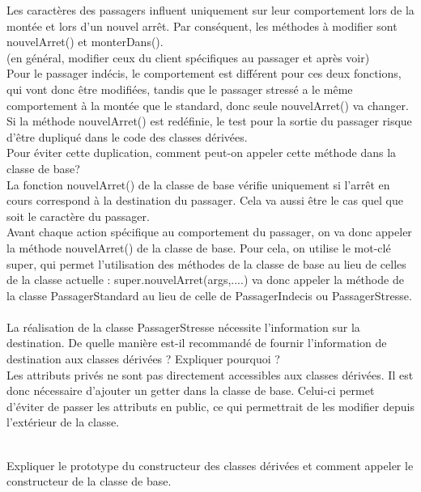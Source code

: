 \documentclass{article}
\begin{document}
Les caractères des passagers influent uniquement sur leur comportement lors de la montée
et lors d’un nouvel arrêt. Par conséquent, les méthodes à modifier sont nouvelArret() et
monterDans().\\
(en général, modifier ceux du client spécifiques au passager et après voir)
\\


Pour le passager indécis, le comportement est différent pour ces deux fonctions, qui vont
donc être modifiées, tandis que le passager stressé a le même comportement à la montée
que le standard, donc seule nouvelArret() va changer.\\

Si la méthode nouvelArret() est redéfinie, le test pour la sortie du passager risque d’être dupliqué dans le code des classes dérivées.\\
Pour éviter cette duplication, comment peut-on appeler cette méthode dans la classe de
base? \\

La fonction nouvelArret() de la classe de base vérifie uniquement si l’arrêt en cours
correspond à la destination du passager. Cela va aussi être le cas quel que soit le caractère du passager.
\\
Avant chaque action spécifique au comportement du passager, on va donc appeler la
méthode nouvelArret() de la classe de base. Pour cela, on utilise le mot-clé super, qui
permet l’utilisation des méthodes de la classe de base au lieu de celles de la classe actuelle : super.nouvelArret(args,....) va donc appeler la méthode de la classe PassagerStandard au lieu de celle de PassagerIndecis ou PassagerStresse.
\\
\\
La réalisation de la classe PassagerStresse nécessite l’information sur la destination.
De quelle manière est-il recommandé de fournir l’information de destination aux classes
dérivées ? Expliquer pourquoi ? \\
Les attributs privés ne sont pas directement accessibles aux classes dérivées. Il est donc nécessaire d’ajouter un getter dans la classe de base. Celui-ci permet d’éviter de passer les attributs en public, ce qui permettrait de les modifier depuis l’extérieur de la classe.

\\
Expliquer le prototype du constructeur des classes dérivées et comment appeler le constructeur de la classe de base.\\
\end{document}
